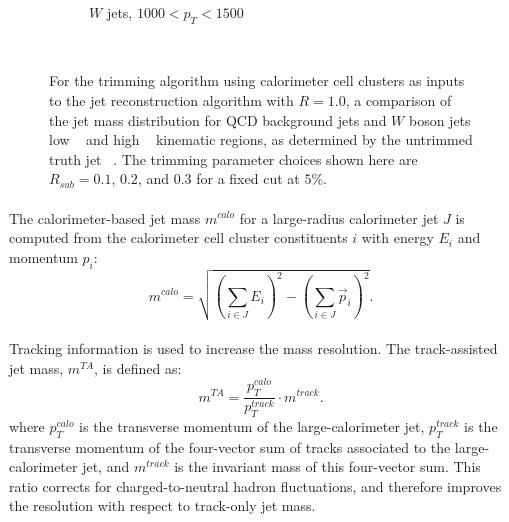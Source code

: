 \begin{figure}[htbp!]
\begin{subfigure}[b]{0.4\textwidth}
        \caption{$W$ jets, $1000 < p_{T} < 1500$ \GeV}
        \label{fig:obj_trim_w_highpt}
    \end{subfigure} \\ 
   \caption{
   For the trimming algorithm using calorimeter cell clusters as inputs to the \akt jet reconstruction algorithm with $R = 1.0$, a comparison of the jet mass distribution for QCD background jets and $W$ boson jets low \pt~ and high \pt~ kinematic regions, as determined by the untrimmed truth jet \pt~. 
   The trimming parameter choices shown here are $R_{sub} = 0.1$, $0.2$, and $0.3$ for a fixed cut at $5\%$.}
  \label{fig:obj_trim}
\end{figure}

\paragraph{}
The calorimeter-based jet mass $m^{calo}$ for  a large-radius calorimeter jet $J$ is computed from the calorimeter cell cluster constituents $i$ with energy $E_i$ and momentum $p_i$:
\begin{equation}
m^{calo} = \sqrt{\left(\sum_{i\in J}E_i\right)^2-\left(\sum_{i\in J}\vec{p}_i\right)^2}.
\end{equation}

\paragraph{}
Tracking information is used to increase the mass resolution.
The track-assisted jet mass, $m^{TA}$, is defined as:
\begin{equation}
m^{TA} = \frac{p_T^{calo}}{p_T^{track}} \cdot m^{track}.
\end{equation}
where $p_{T}^{calo}$ is the transverse momentum of the large-\R calorimeter jet, $p_{T}^{track}$ is the transverse momentum of the four-vector sum of tracks associated to the large-\R calorimeter jet, and $m^{track}$ is the invariant mass of this four-vector sum.
This ratio corrects for charged-to-neutral hadron fluctuations, and therefore improves the resolution with respect to track-only jet mass.

